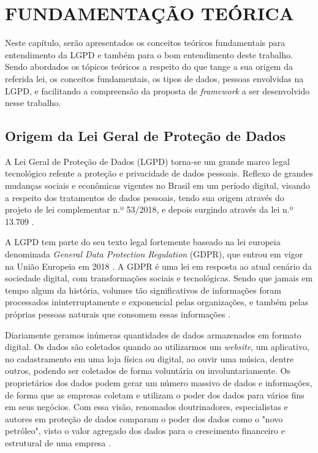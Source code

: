 \documentclass[
	12pt,				%
	openright,			%
	oneside,			%
	a4paper,			%
	english,			%
	french,				%
	spanish,			%
	brazil,				%
	]{abntex2}
\begin{document}
\setcounter{chapter}{1}
\chapter{FUNDAMENTAÇÃO TEÓRICA}
\label{ch: fundamentacao teorica}


Neste capítulo, serão apresentados os conceitos teóricos fundamentais para entendimento da LGPD e também para o bom entendimento deste trabalho. Sendo abordados os tópicos teóricos a respeito do que tange a sua origem da referida lei, os conceitos fundamentais, os tipos de dados, pessoas envolvidas na LGPD, e facilitando a compreensão da proposta de \textit{framework} a ser desenvolvido nesse trabalho.

\section{Origem da Lei Geral de Proteção de Dados }
\label{sec: exemplo}

A Lei Geral de Proteção de Dados (LGPD) torna-se um grande marco legal tecnológico refente a proteção e privacidade de dados pessoais. Reflexo de grandes mudanças sociais e econômicas vigentes no Brasil em um período digital, visando a respeito dos tratamentos de dados pessoais, tendo sua origem através do projeto de lei complementar n.º 53/2018, e depois surgindo através da lei n.º 13.709 \cite{01-01-LeiGeral}. 

A LGPD tem parte do seu texto legal fortemente baseado na lei europeia denominada \textit{General Data Protection Regulation} (GDPR), que entrou em vigor na União Europeia em 2018 \cite{02-01-Redecker2021}. A GDPR é uma lei em resposta ao atual cenário da sociedade digital, com transformações sociais e tecnológicas. Sendo que jamais em tempo algum da história, volumes tão significativos de informações foram processados ininterruptamente e exponencial pelas organizações, e também pelas próprias pessoas naturais que consomem essas informações \cite{02-01-Vainzof2020}.

Diariamente geramos inúmeras quantidades de dados armazenados em formato digital. Os dados são coletados quando ao utilizarmos um \textit{website}, um aplicativo, no cadastramento em uma loja física ou digital, ao ouvir uma música, dentre outros, podendo ser coletados de forma voluntária ou involuntariamente. Os proprietários dos dados podem gerar um número massivo de dados e informações, de forma que as empresas coletam e utilizam o poder dos dados para vários fins em seus negócios. Com essa visão, renomados doutrinadores, especialistas e autores em proteção de dados comparam o poder dos dados como o "novo petróleo", visto o valor agregado dos dados para o crescimento financeiro e estrutural de uma empresa \cite{02-01-Jobim2021}. 
\end{document}
